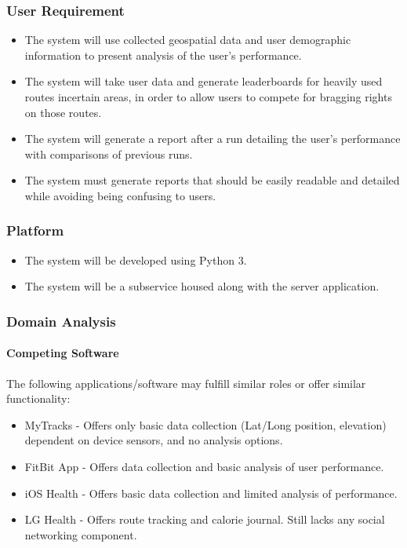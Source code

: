 ﻿\documentclass{article}
\begin{document}
\subsubsection{User Requirement}
\begin{itemize}
    \item The system will use collected geospatial data and user demographic information to present analysis of the user’s performance.
    \item The system will take user data and generate leaderboards for heavily used routes incertain areas, in order to allow users to compete for bragging rights on those routes.
    \item The system will generate a report after a run detailing the user’s performance with comparisons of previous runs.
    \item The system must generate reports that should be easily readable and detailed while avoiding being confusing to users.
\end{itemize}

\subsubsection{Platform}
\begin{itemize}
    \item The system will be developed using Python 3.
    \item The system will be a subservice housed along with the server application.
\end{itemize}

\subsubsection{Domain Analysis}
\paragraph{Competing Software}
The following applications/software may fulfill similar roles or offer similar functionality:
\begin{itemize}
    \item MyTracks - Offers only basic data collection (Lat/Long position, elevation) dependent on device sensors, and no analysis options.
    \item FitBit App - Offers data collection and basic analysis of user performance.
    \item iOS Health - Offers basic data collection and limited analysis of performance.
    \item LG Health - Offers route tracking and calorie journal. Still lacks any social networking component.
\end{itemize}
\end{document}
